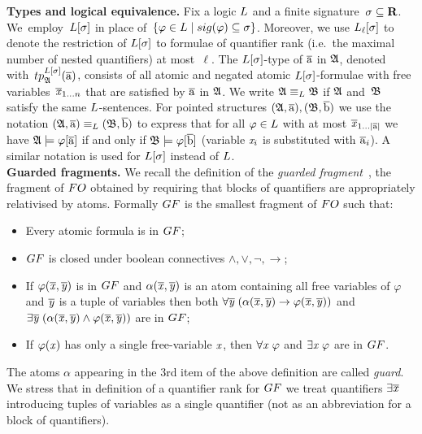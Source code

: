\noindent \textbf{Types and logical equivalence.}
Fix a logic $\logicL$ and a finite signature~$\sigma \subseteq \mathbf{R}$. 
We~employ~$\logicL[\sigma]$ in place of~$\{ \varphi \in \logicL \mid \sig(\varphi) \subseteq \sigma \}$.
Moreover, we use $\logicL_\ell[\sigma]$ to denote the restriction of $\logicL[\sigma]$ to formulae of quantifier rank (i.e.\ the maximal number of nested quantifiers) at most~$\ell$.  
%
The $\logicL[\sigma]$-type of $\overline{\mathrm{a}}$ in ${\mathfrak{A}}$, denoted with~$\tp{\logicL[\sigma]}{\str{A}}{\elemtuplea}$, consists of all atomic and negated atomic $\logicL[\sigma]$-formulae with free variables~$\overline{\mathit{x}}_{1\ldots n}$ that are satisfied by $\overline{\mathrm{a}}$ in ${\mathfrak{A}}$.
We write $\str{A} \equiv_\logicL \str{B}$ if ${\mathfrak{A}}$ and~${\mathfrak{B}}$ satisfy the same $\logicL$-sentences.
For pointed structures $({\mathfrak{A}}, \overline{\mathrm{a}}), ({\mathfrak{B}}, \overline{\mathrm{b}})$ we use the notation $(\str{A}, \elemtuplea) \equiv_\logicL (\str{B}, \elemtupleb)$ to express that for all $\varphi \in \logicL$ with at most $\overline{\mathit{x}}_{1\ldots|\overline{\mathrm{a}}|}$ we have ${\mathfrak{A}} \models \varphi[\overline{\mathrm{a}}]$ if and only if ${\mathfrak{B}} \models \varphi[\overline{\mathrm{b}}]$ (variable $\mathit{x}_i$ is substituted with $\overline{\mathrm{a}}_i$). 
A similar notation is used for $\logicL[\sigma]$ instead of $\logicL$.\\

\noindent \textbf{Guarded fragments.}
We recall the definition of the \emph{guarded fragment}~\cite[Sec. 4.1]{AndrekaNB98}, \ie the fragment of $\FO$ obtained by requiring that blocks of quantifiers are appropriately relativised by atoms.
Formally $\GF$ is the smallest fragment of $\FO$  such that:
\begin{itemize}\itemsep0em
    \item Every atomic formula is in $\GF$;
    \item $\GF$ is closed under boolean connectives $\land, \lor, \neg, \to$;
    \item If $\varphi(\overline{\mathit{x}}, \overline{\mathit{y}})$ is in $\GF$ and $\alpha(\overline{\mathit{x}}, \overline{\mathit{y}})$ is an atom containing all free variables of $\varphi$ and $\overline{\mathit{y}}$ is a tuple of variables then both $\forall{\overline{\mathit{y}}} \; (\alpha(\overline{\mathit{x}}, \overline{\mathit{y}}) \to \varphi(\overline{\mathit{x}}, \overline{\mathit{y}}))$ and $\exists{\overline{\mathit{y}}} \; (\alpha(\overline{\mathit{x}}, \overline{\mathit{y}}) \land \varphi(\overline{\mathit{x}}, \overline{\mathit{y}}))$ are in $\GF$; 
    \item If $\varphi(\mathit{x})$ has only a single free-variable $\mathit{x}$, then $\forall{\mathit{x}}\; \varphi$ and $\exists{\mathit{x}}\; \varphi$ are in $\GF$.
\end{itemize}
The atoms $\alpha$ appearing in the 3rd item of the above definition are called \emph{guard}.
We stress that in definition of a quantifier rank for $\GF$ we treat quantifiers $\exists{\overline{\mathit{x}}}$ introducing tuples of variables as a single quantifier (not as an abbreviation for a block of quantifiers).

